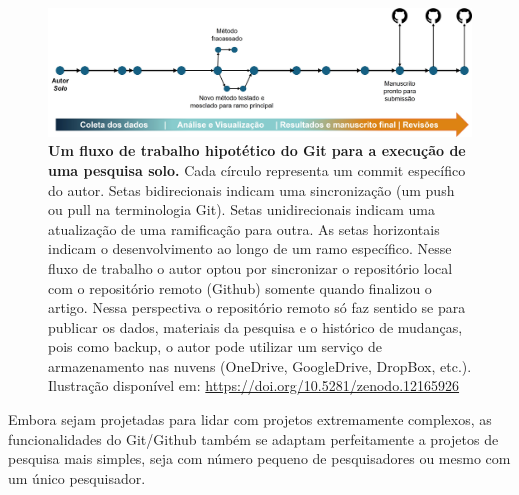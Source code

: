 \documentclass[
  a4paper,
]{article}
\begin{document}
\begin{figure}

\includegraphics{img/gitautorend.jpg}

\caption{\label{fig-gitautorend}\textbf{Um fluxo de trabalho hipotético
do Git para a execução de uma pesquisa solo.} Cada círculo representa um
commit específico do autor. Setas bidirecionais indicam uma
sincronização (um push ou pull na terminologia Git). Setas
unidirecionais indicam uma atualização de uma ramificação para outra. As
setas horizontais indicam o desenvolvimento ao longo de um ramo
específico. Nesse fluxo de trabalho o autor optou por sincronizar o
repositório local com o repositório remoto (Github) somente quando
finalizou o artigo. Nessa perspectiva o repositório remoto só faz
sentido se para publicar os dados, materiais da pesquisa e o histórico
de mudanças, pois como backup, o autor pode utilizar um serviço de
armazenamento nas nuvens (OneDrive, GoogleDrive, DropBox, etc.).
Ilustração disponível em: \url{https://doi.org/10.5281/zenodo.12165926}}

\end{figure}%

Embora sejam projetadas para lidar com projetos extremamente complexos,
as funcionalidades do Git/Github também se adaptam perfeitamente a
projetos de pesquisa mais simples, seja com número pequeno de
pesquisadores ou mesmo com um único pesquisador.
\end{document}
